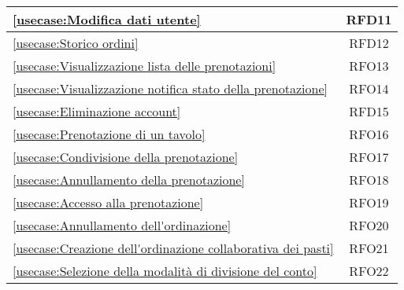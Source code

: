 \begin{longtable}{|l|c|}
	\hline
	\autoref{usecase:Modifica dati utente}                                                                                                                       & RFD11                  \\
	\hline
	\autoref{usecase:Storico ordini}                                                                                                                             & RFD12                  \\
	\hline
	\autoref{usecase:Visualizzazione lista delle prenotazioni}                                           														& RFO13                  \\
	\hline
	\autoref{usecase:Visualizzazione notifica stato della prenotazione}                                                                                          & RFO14                  \\
	\hline
	\autoref{usecase:Eliminazione account}                                                                                                                       & RFD15                  \\
	\hline
	\autoref{usecase:Prenotazione di un tavolo}                                                                                                                  & RFO16                  \\
	\hline
	\autoref{usecase:Condivisione della prenotazione}                                                                                                            & RFO17                  \\
	\hline
	\autoref{usecase:Annullamento della prenotazione}                                                                                                            & RFO18                  \\
	\hline
	\autoref{usecase:Accesso alla prenotazione}                                                                                                                  & RFO19                  \\
	\hline
	\autoref{usecase:Annullamento dell'ordinazione}                                                                                                              & RFO20                  \\
	\hline
	\autoref{usecase:Creazione dell'ordinazione collaborativa dei pasti}                                                                                         & RFO21                  \\
	\hline
	\autoref{usecase:Selezione della modalità di divisione del conto}                                                                                            & RFO22                  \\

\end{longtable}

